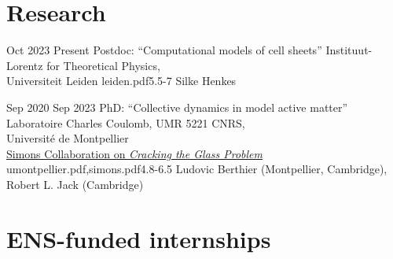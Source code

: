 \documentclass[a4paper]{cvtemplate_en} %
\begin{document}
\makeprofile %


\vspace{2mm}
\section{Research}

\begin{cvbody}

\cvitem
	{Oct 2023}
	{Present}
  {Postdoc: ``Computational models of cell sheets''}
  {Instituut-Lorentz for Theoretical Physics,\\ Universiteit Leiden }
  {leiden.pdf}{5.5}{-7}
	{Silke Henkes}
  {\\}

\cvitem
	{Sep 2020}
	{Sep 2023}
  {PhD: ``Collective dynamics in model active matter''}
  {Laboratoire Charles Coulomb, UMR 5221 CNRS,\\ Universit\'e de Montpellier \\
  \href{https://scglass.uchicago.edu}{Simons Collaboration on \textit{Cracking the Glass Problem}}}
  {umontpellier.pdf,simons.pdf}{4.8}{-6.5}
	{Ludovic Berthier (Montpellier, Cambridge),\\ Robert L. Jack (Cambridge)}
  {\\}

\end{cvbody}

\section{ENS-funded internships}
\end{document}
